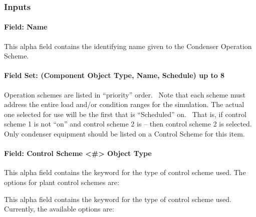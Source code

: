 \subsubsection{Inputs}\label{inputs-1-030}

\paragraph{Field: Name}\label{field-name-1-029}

This alpha field contains the identifying name given to the Condenser Operation Scheme.

\paragraph{Field Set: (Component Object Type, Name, Schedule) up to 8}\label{field-set-component-object-type-name-schedule-up-to-8-1}

Operation schemes are listed in ``priority'' order.~ Note that each scheme must address the entire load and/or condition ranges for the simulation. The actual one selected for use will be the first that is ``Scheduled'' on.~ That is, if control scheme 1 is not ``on'' and control scheme 2 is -- then control scheme 2 is selected. Only condenser equipment should be listed on a Control Scheme for this item.

\paragraph{Field: Control Scheme \textless{}\#\textgreater{} Object Type}\label{field-control-scheme-object-type-1}

This alpha field contains the keyword for the type of control scheme used. The options for plant control schemes are:

This alpha field contains the keyword for the type of control scheme used. Currently, the available options are:

